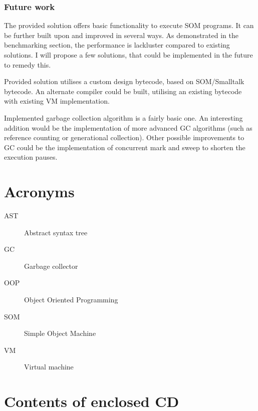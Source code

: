 \documentclass[thesis=M,english]{FITthesis}[2019/12/23]
\begin{document}
\subsection{Future work}
The provided solution offers basic functionality to execute SOM programs. It can be further built upon and improved in several ways.
As demonstrated in the benchmarking section, the performance is lackluster compared to existing solutions. I will propose a few
solutions, that could be implemented in the future to remedy this.

Provided solution utilises a custom design bytecode, based on SOM/Smalltalk bytecode. An alternate compiler could be built, utilising
an existing bytecode with existing VM implementation. 

Implemented garbage collection algorithm is a fairly basic one. An interesting addition would be the implementation of more advanced GC
algorithms (such as reference counting or generational collection). Other possible improvements to GC could be the implementation
of concurrent mark and sweep to shorten the execution pauses.





\appendix

\chapter{Acronyms}
\begin{description}
	\item[AST] Abstract syntax tree
	\item[GC] Garbage collector
	\item[OOP] Object Oriented Programming 
	\item[SOM] Simple Object Machine 
	\item[VM] Virtual machine 
\end{description}


\chapter{Contents of enclosed CD}


\begin{figure}
\end{figure}
\end{document}
